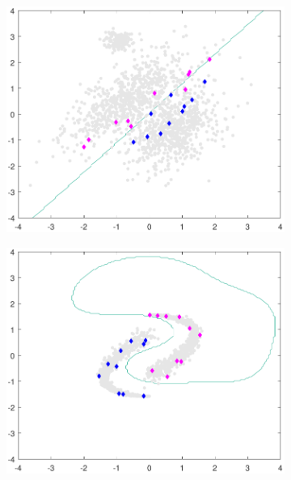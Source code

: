 \documentclass[preprint,12pt]{elsarticle}
\begin{document}
	\begin{figure}[!htb]
		\centering
		\begin{subfigure}[b]{0.40\linewidth}
			\centering\includegraphics[width=1\linewidth]{figures/normdatamodel_hyperplane_robsvm.pdf}
			\caption{\label{fig:solRob1}} 
		\end{subfigure}
		\begin{subfigure}[b]{0.40\linewidth}
			\centering\includegraphics[width=1\linewidth]{figures/yydatamodel_hyperplane_robsvm.pdf}
			\caption{\label{fig:solRob2}}
		\end{subfigure} \\
		

\end{figure}
\end{document}
